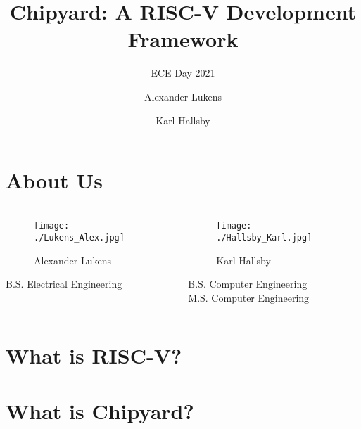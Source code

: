 \documentclass{eceday}
\title[Chipyard]{Chipyard: A RISC-V Development Framework}
\subtitle{ECE Day 2021}
\author{Alexander Lukens \and Karl Hallsby}
\institute{Illinois Institute of Technology}
\date{\DTMdisplaydate{2021}{4}{9}{-1}}
\begin{document}
\nocite{chipyard}

\begin{frame}
  \titlepage{}
\end{frame}

\section{About Us}\label{sec:About_Us}
\begin{frame}
  \frametitle{}
  \begin{columns}
    \begin{column}{0.50\linewidth}
      \begin{figure}[h!tbp]
        \centering
        \texttt{[image: ./Lukens\_Alex.jpg]}
        \caption*{Alexander Lukens}
        \label{fig:Alex_Lukens}
      \end{figure}
      B.S. Electrical Engineering
    \end{column}
    \begin{column}{0.50\linewidth}
      \begin{figure}[h!tbp]
        \centering
        \texttt{[image: ./Hallsby\_Karl.jpg]}
        \caption*{Karl Hallsby}
        \label{fig:Karl_Hallsby}
      \end{figure}
      B.S. Computer Engineering \\
      M.S. Computer Engineering
    \end{column}
  \end{columns}
\end{frame}

\section{What is RISC-V?}\label{sec:What_is_RISC-V}
\begin{frame}
  \frametitle{}
\end{frame}

\section{What is Chipyard?}\label{sec:What_is_Chipyard}
\begin{frame}
  \frametitle{}
\end{frame}
\end{document}
